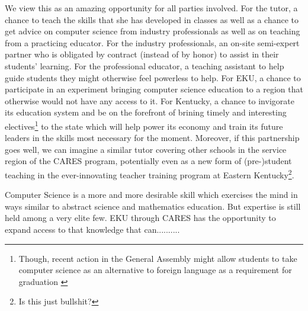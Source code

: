 We view this as an amazing opportunity for all parties involved. For the tutor,
a chance to teach the skills that she has developed in classes as well as a
chance to get advice on computer science from industry professionals as well as
on teaching from a practicing educator. For the industry professionals, an
on-site semi-expert partner who is obligated by contract (instead of by honor) to
assist in their students' learning. For the professional educator, a teaching
assistant to help guide students they might otherwise feel powerless to help.
For EKU, a chance to participate in an experiment bringing computer science
education to a region that otherwise would not have any access to it. For
Kentucky, a chance to invigorate its education system and be on the forefront
of brining timely and interesting electives\footnote{Though, recent action in the General Assembly might allow students to take computer science as an alternative to foreign language as a requirement for graduation \autocite{CJSB16}} to the state
which will help power its economy and train its future leaders in the skills
most necessary for the moment. Moreover, if this partnership goes well, we
can imagine a similar tutor covering other schools in the service region of the
CARES program, potentially even as a new form of (pre-)student teaching in the
ever-innovating teacher training program at Eastern Kentucky\footnote{Is this
just bullshit?}.

Computer Science is a more and more desirable skill which exercises the mind
in ways similar to abstract science and mathematics education. But expertise is
still held among a very elite few. EKU through CARES has the opportunity to
expand access to that knowledge that can..........
